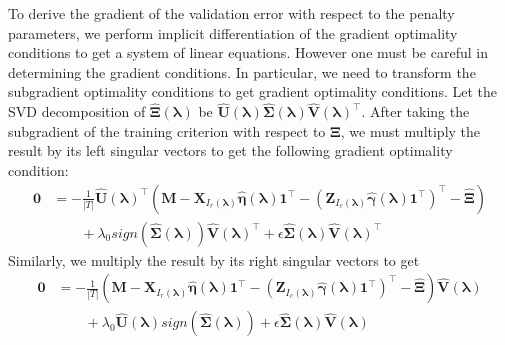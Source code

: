 \documentclass[12pt,letterpaper]{article}
\begin{document}
To derive the gradient of the validation error with respect to the penalty parameters, we perform implicit differentiation of the gradient optimality conditions to get a system of linear equations. However one must be careful in determining the gradient conditions. In particular, we need to transform the subgradient optimality conditions to get gradient optimality conditions. 
Let the SVD decomposition of $\hat{\boldsymbol{\Xi}}(\boldsymbol{\lambda})$ be $\hat{\boldsymbol{U}}(\boldsymbol{\lambda}) \hat{\boldsymbol{\Sigma}}(\boldsymbol{\lambda})  \hat{\boldsymbol{V}}(\boldsymbol{\lambda})^\top$.
After taking the subgradient of the training criterion with respect to $\boldsymbol{\Xi}$, we must multiply the result by its left singular vectors to get the following gradient optimality condition:
\begin{align}
\boldsymbol{0} & = 
- \frac{1}{|T|} 
\hat{\boldsymbol{U}}(\boldsymbol{\lambda})^\top
\left (
\boldsymbol{M} 
- \boldsymbol{X}_{I_r(\boldsymbol{\lambda})} \hat{\boldsymbol{\eta}}(\boldsymbol{\lambda}) \boldsymbol{1}^\top 
- (\boldsymbol{Z}_{I_c(\boldsymbol{\lambda})} \hat{\boldsymbol{\gamma}}(\boldsymbol{\lambda})  \boldsymbol{1}^\top )^\top
- \hat{\boldsymbol{\Xi}}
\right )\\
& \qquad + \lambda_0 sign(\hat{\boldsymbol{\Sigma}}(\boldsymbol{\lambda})) \hat{\boldsymbol{V}}(\boldsymbol{\lambda})^\top
+ \epsilon \hat{\boldsymbol{\Sigma}}(\boldsymbol{\lambda}) \hat{\boldsymbol{V}}(\boldsymbol{\lambda})^\top
\end{align}
Similarly, we multiply the result by its right singular vectors to get
\begin{align}
\boldsymbol{0} & = - \frac{1}{|T|} 
\left (
\boldsymbol{M} 
- \boldsymbol{X}_{I_r(\boldsymbol{\lambda})} \hat{\boldsymbol{\eta}}(\boldsymbol{\lambda}) \boldsymbol{1}^\top 
- (\boldsymbol{Z}_{I_c(\boldsymbol{\lambda})} \hat{\boldsymbol{\gamma}}(\boldsymbol{\lambda})  \boldsymbol{1}^\top )^\top
- \hat{\boldsymbol{\Xi}}
\right )
\hat{\boldsymbol{V}}(\boldsymbol{\lambda})\\
& \qquad + \lambda_0 \hat{\boldsymbol{U}}(\boldsymbol{\lambda}) sign(\hat{\boldsymbol{\Sigma}}(\boldsymbol{\lambda})) 
+ \epsilon \hat{\boldsymbol{\Sigma}}(\boldsymbol{\lambda}) \hat{\boldsymbol{V}}(\boldsymbol{\lambda})
\label{eq:grad_opt_matrix_comp}
\end{align}
\end{document}
